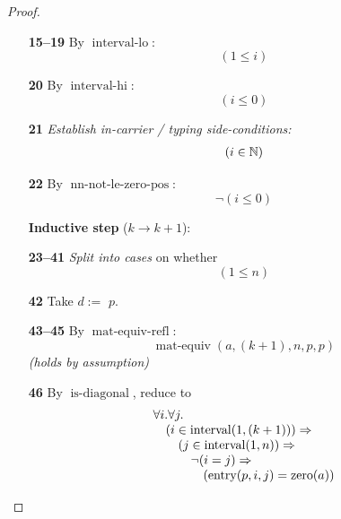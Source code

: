 \documentclass[11pt]{article}
\theoremstyle{plain}
\begin{document}
\begin{proof}
\begin{itemize}[leftmargin=2.8em, itemsep=4pt, parsep=1pt]
  \item[\textbf{15--19}] By $\operatorname{interval\text{-}lo}$:
\begin{equation*}
(1 \leq i)
\end{equation*}

  \item[\textbf{20}] By $\operatorname{interval\text{-}hi}$:
\begin{equation*}
(i \leq 0)
\end{equation*}

  \item[\textbf{21}] \emph{Establish in-carrier / typing side-conditions:}
\begin{equation*}
\begin{array}{@{}l@{}}
(i \in \mathbb{N})
\end{array}
\end{equation*}

  \item[\textbf{22}] By $\operatorname{nn\text{-}not\text{-}le\text{-}zero\text{-}pos}$:
\begin{equation*}
\neg (i \leq 0)
\end{equation*}

  \item[]\textbf{Inductive step} ($k \to k + 1$):
  \item[\textbf{23--41}] \emph{Split into cases} on whether
\begin{equation*}
(1 \leq n)
\end{equation*}

  \item[\textbf{42}] Take $d :=$ $p$.
  \item[\textbf{43--45}] By $\operatorname{mat\text{-}equiv\text{-}refl}$:
\begin{equation*}
\operatorname{mat\text{-}equiv}(a, (k + 1), n, p, p)
\end{equation*}
  \emph{(holds by assumption)}
  \item[\textbf{46}] By $\operatorname{is\text{-}diagonal}$, reduce to
\begin{equation*}
\begin{array}{@{}l@{}} \forall i. \forall j. \\ \quad (i \in \operatorname{interval}(1, (k + 1))) \Rightarrow  \\ \quad \quad (j \in \operatorname{interval}(1, n)) \Rightarrow  \\ \quad \quad \quad \neg (i = j) \Rightarrow  \\ \quad \quad \quad \quad (\operatorname{entry}(p, i, j) = \operatorname{zero}(a)) \end{array}
\end{equation*}


\end{itemize}
\end{proof}
\end{document}
